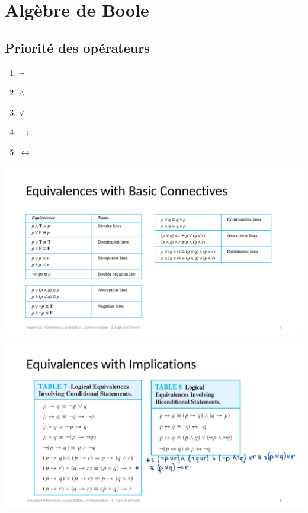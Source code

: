 \documentclass[12pt]{article}
\begin{document}
\section*{Algèbre de Boole}

\subsection*{Priorité des opérateurs}
\begin{enumerate}
    \item $\neg$
    \item $\land$
    \item $\lor$
    \item $\to$
    \item $\leftrightarrow$
\end{enumerate}

\begin{minipage}{0.1\textwidth}
    \includegraphics[scale=0.25]{Equivalence-with-basic-connective.jpeg}
\end{minipage}

\begin{minipage}{0.1\textwidth}
    \includegraphics[scale=0.25]{Equivalence-with-implication.jpeg}
\end{minipage}
\end{document}
